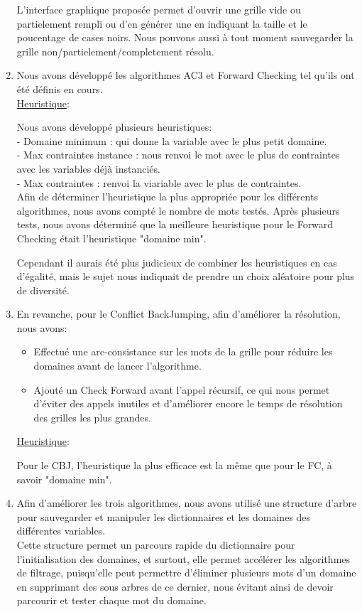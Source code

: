 \documentclass[a4paper,12pt]{report}
\begin{document}
\begin{enumerate}
L'interface graphique proposée permet d'ouvrir une grille vide ou partielement rempli ou d'en générer une en indiquant la taille et le poucentage de cases noirs. Nous pouvons aussi à tout moment sauvegarder la grille non/partielement/completement résolu. \\

\item Nous avons développé les algorithmes AC3 et Forward Checking tel qu'ils ont été définis en cours. \\

\ul{Heuristique}:

Nous avons développé plusieurs heuristiques:\\
 - Domaine minimum : qui donne la variable avec le plus petit domaine.\\
 - Max contraintes instance : nous renvoi le mot avec le plus de contraintes avec les variables déjà instanciés.\\
 - Max contraintes : renvoi la viariable avec le plus de contraintes.\\
 
Afin de déterminer l'heuristique la plus appropriée pour les différents algorithmes, nous avons compté le nombre de mots testés.
Après plusieurs tests, nous avons déterminé que la meilleure heuristique pour le Forward Checking était l'heuristique "domaine min". 

Cependant il aurais été plus judicieux de combiner les heuristiques en cas d'égalité, mais le sujet nous indiquait de prendre un choix aléatoire pour plus de diversité.\\

\item En revanche, pour le Conflict BackJumping, afin d'améliorer la résolution, nous avons:
\begin{itemize}
\item Effectué une arc-consistance sur les mots de la grille pour réduire les domaines avant de lancer l'algorithme.
\item Ajouté un Check Forward avant l'appel récursif, ce qui nous permet d'éviter des appels inutiles et d'améliorer encore le temps de résolution des grilles les plus grandes.\\
\end{itemize}

\ul{Heuristique}:

Pour le CBJ, l'heuristique la plus efficace est la même que pour le FC, à savoir "domaine min".\\

\item Afin d'améliorer les trois algorithmes, nous avons utilisé une structure d'arbre pour sauvegarder et manipuler les dictionnaires et les domaines des différentes variables.\\
 Cette structure permet un parcours rapide du dictionnaire pour l'initialisation des domaines, et surtout, elle permet accélérer les algorithmes de filtrage, puisqu'elle peut permettre d'éliminer plusieurs mots d'un domaine en supprimant des sous arbres de ce dernier, nous évitant ainsi de devoir parcourir et tester chaque mot du domaine.\\
\end{enumerate}
\end{document}

